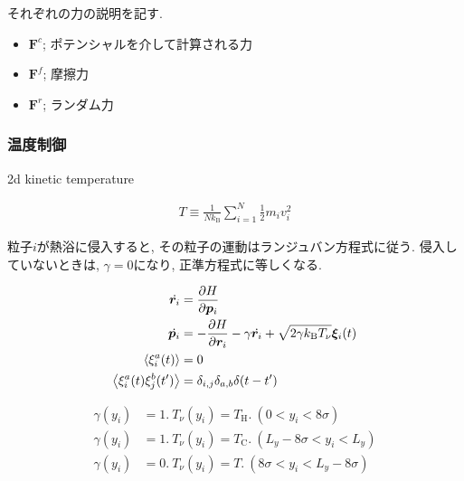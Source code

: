 それぞれの力の説明を記す.

\begin{itemize}
  \item $\bm{F}^c$; ポテンシャルを介して計算される力
  \item $\bm{F}^f$; 摩擦力
  \item $\bm{F}^r$; ランダム力
\end{itemize}


\subsubsection{温度制御}


2d kinetic temperature

\begin{align}
  T \equiv \frac{1}{Nk_{\text{B}}}\sum_{i=1}^{N} \frac{1}{2}m_i v_{i}^2
\end{align}

粒子$i$が熱浴に侵入すると, その粒子の運動はランジュバン方程式に従う. 侵入していないときは, $\gamma = 0$になり, 正準方程式に等しくなる.

\begin{align}
  \dot{\bm{r}_i} &= \pdv{H}{\bm{p}_i} \\
  \dot{\bm{p}_i} &= - \pdv{H}{\bm{r}_i} - \gamma \dot{\bm{r}_i} + \sqrt{2 \gamma k_{\text{B}}T_{\nu}}\bm{\xi}_i (t) \\
  \expval{\xi_{i}^{a}(t)} &= 0 \\
  \expval{\xi_{i}^{a}(t)\xi_{j}^{b}(t')} &= \delta_{i,j} \delta_{a,b}\delta (t-t') 
\end{align}

\begin{align}
  \gamma(y_i) &= 1. \ T_{\nu}(y_i) = T_{\text{H}}. \ (0 < y_i < 8\sigma) \\
  \gamma(y_i) &= 1. \ T_{\nu}(y_i) = T_{\text{C}}. \ (L_y - 8\sigma < y_i < L_y) \\
  \gamma(y_i) &= 0. \ T_{\nu}(y_i) = T. \ (8\sigma < y_i < L_y - 8\sigma)
\end{align}
